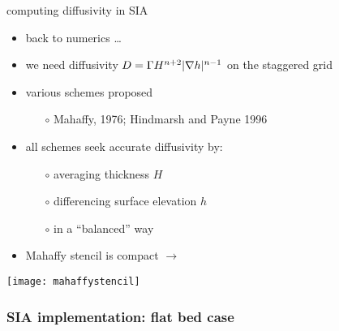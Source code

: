 \begin{frame}{computing diffusivity in SIA}

\begin{itemize}
\item back to numerics \dots
\item we need diffusivity $D = \Gamma H^{n+2} |\nabla h|^{n-1}$ on the staggered grid
\item various schemes proposed
  \begin{itemize}
  \item[$\circ$] Mahaffy, 1976; Hindmarsh and Payne 1996
  \end{itemize}
\item all schemes seek accurate diffusivity by:
  \begin{itemize}
  \item[$\circ$] averaging thickness $H$
  \item[$\circ$] differencing surface elevation $h$
  \item[$\circ$] in a ``balanced'' way
  \end{itemize}
\item Mahaffy stencil is compact $\longrightarrow$
\end{itemize}

\vspace{-10mm}
\hfill  \texttt{[image: mahaffystencil]}
\end{frame}


\begin{frame}
  \frametitle{SIA implementation: flat bed case}


\end{frame}


